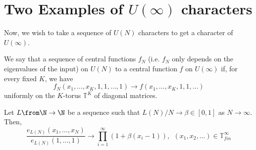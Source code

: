 \documentclass[11pt,leqno,oneside]{amsart}
\numberwithin{thm}{section}
\newcommand{\T}{\mathbb{T}} %
\begin{document}
\section{Two Examples of \(U(\infty)\) characters}
Now, we
wish to take a sequence of \(U(N)\) characters to get a
character of \(U(\infty)\).
\begin{defn}\label{converge-defn}
  We say that a sequence of central functions \(f_N\) (i.e. \(f_N\)
  only depends on the eigenvalues of the input) on \(U(N)\)
   to a central function \(f\) on \(U(\infty)\) if,
  for every fixed \(K\), we have \[
    f_N(x_1, \ldots, x_K,1,1, \ldots, 1) \to f(x_1, \ldots, x_K, 1, 1,
    \ldots)
  \]
  uniformly on the \(K\)-torus \(\T^K\) of diagonal matrices. 
\end{defn}
\begin{prop}
  Let \(L \from \N \to \N\) be a sequence such that \(L(N)/N \to \beta
  \in [0,1]\) as \(N \to \infty\). Then, \[
    \frac{e_{L(N)}(x_1, \ldots, x_N)}{e_{L(N)}(1,\ldots,1)} \to
    \prod_{i=1}^\infty (1+\beta(x_i-1)), \ \ (x_1, x_2, \ldots) \in \T^\infty_{fin}
  \]
\end{prop}
\end{document}
